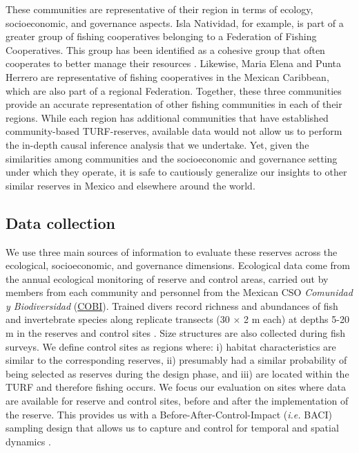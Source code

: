 \documentclass{frontiersSCNS}
\begin{document}
These communities are representative of their region in terms of
ecology, socioeconomic, and governance aspects. Isla Natividad, for
example, is part of a greater group of fishing cooperatives belonging to
a Federation of Fishing Cooperatives. This group has been identified as
a cohesive group that often cooperates to better manage their resources
\citep{mccay_2014-CN,mccay_2017,acevesbueno_2017}. Likewise, Maria Elena
and Punta Herrero are representative of fishing cooperatives in the
Mexican Caribbean, which are also part of a regional Federation.
Together, these three communities provide an accurate representation of
other fishing communities in each of their regions. While each region
has additional communities that have established community-based
TURF-reserves, available data would not allow us to perform the in-depth
causal inference analysis that we undertake. Yet, given the similarities
among communities and the socioeconomic and governance setting under
which they operate, it is safe to cautiously generalize our insights to
other similar reserves in Mexico and elsewhere around the world.

\hypertarget{data-collection}{%
\subsection{Data collection}\label{data-collection}}

We use three main sources of information to evaluate these reserves
across the ecological, socioeconomic, and governance dimensions.
Ecological data come from the annual ecological monitoring of reserve
and control areas, carried out by members from each community and
personnel from the Mexican CSO \emph{Comunidad y Biodiversidad}
(\href{www.cobi.org.mx}{COBI}). Trained divers record richness and
abundances of fish and invertebrate species along replicate transects
(30 \(\times\) 2 m each) at depths 5-20 m in the reserves and control
sites \citep{fulton_2018,fulton_2019,suman_2010-ez}. Size structures are
also collected during fish surveys. We define control sites as regions
where: i) habitat characteristics are similar to the corresponding
reserves, ii) presumably had a similar probability of being selected as
reserves during the design phase, and iii) are located within the TURF
and therefore fishing occurs. We focus our evaluation on sites where
data are available for reserve and control sites, before and after the
implementation of the reserve. This provides us with a
Before-After-Control-Impact (\emph{i.e.} BACI) sampling design that
allows us to capture and control for temporal and spatial dynamics
\citep{stewartoaten_1986,depalma_2018}.
\end{document}
